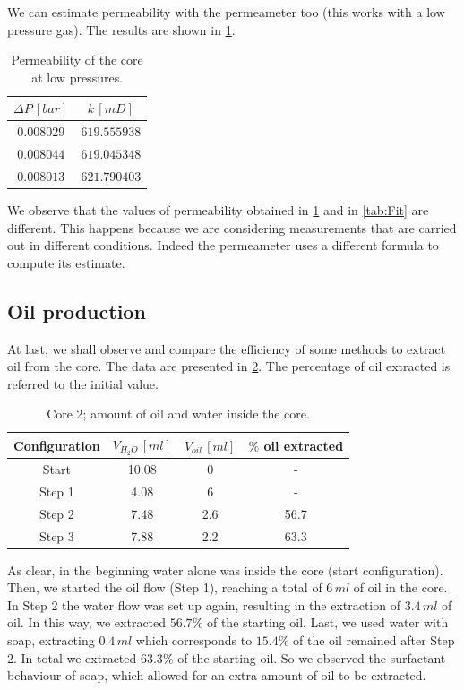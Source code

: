 \documentclass[10pt, a4paper]{amsart}
\begin{document}
We can estimate permeability with the permeameter too (this works with a low pressure gas). The results are shown in \cref{tab:PermModern}.
\begin{table}[H]
    \centering
    \begin{tabular}{cc}
    \toprule
        $\Delta P \, [bar]$ & $k \, [mD]$\\
    \midrule
        $0.008029$ & $619.555938$ \\
        $0.008044$ & $619.045348$\\
        $0.008013$ & $621.790403$\\
    \bottomrule
    \end{tabular}
    \caption{Permeability of the core at low pressures.}
    \label{tab:PermModern}
\end{table}
We observe that the values of permeability obtained in \cref{tab:PermModern} and in \cref{tab:Fit} are different. This happens because we are considering measurements that are carried out in different conditions. Indeed the permeameter uses a different formula to compute its estimate.

\subsection{Oil production}
At last, we shall observe and compare the efficiency of some methods to extract oil from the core. The data are presented in \cref{tab:OilOutput}. The percentage of oil extracted is referred to the initial value.
\begin{table}[H]
    \centering
    \begin{tabular}{cccc}
    \toprule
        Configuration & $V_{H_2O} \, [ml]$ & $V_{oil} \, [ml]$ & $\%$ oil extracted\\
    \midrule
        Start & 10.08 & 0 & -\\
        Step 1 & 4.08 & 6 & -\\
        Step 2 & 7.48 & 2.6 & 56.7\\
        Step 3 & 7.88 & 2.2 & 63.3\\
    \bottomrule
    \end{tabular}
    \caption{Core 2; amount of oil and water inside the core.}
    \label{tab:OilOutput}
\end{table}
As clear, in the beginning water alone was inside the core (start configuration). Then, we started the oil flow (Step 1), reaching a total of $6\,ml$ of oil in the core. In Step 2 the water flow was set up again, resulting in the extraction of $3.4\,ml$ of oil. In this way, we extracted $56.7 \%$ of the starting oil. Last, we used water with soap, extracting $0.4\,ml$ which corresponds to $15.4\%$ of the oil remained after Step 2. In total we extracted $63.3 \%$ of the starting oil. So we observed the surfactant behaviour of soap, which allowed for an extra amount of oil to be extracted.
\end{document}
